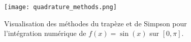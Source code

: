 \documentclass{article}
\begin{document}
\begin{figure}[H]
    \centering
    \texttt{[image: quadrature\_methods.png]}
    \caption{Visualisation des méthodes du trapèze et de Simpson pour l'intégration numérique de $f(x) = \sin(x)$ sur $[0, \pi]$.}
    \label{fig:quadrature_methods}
\end{figure}
\end{document}

